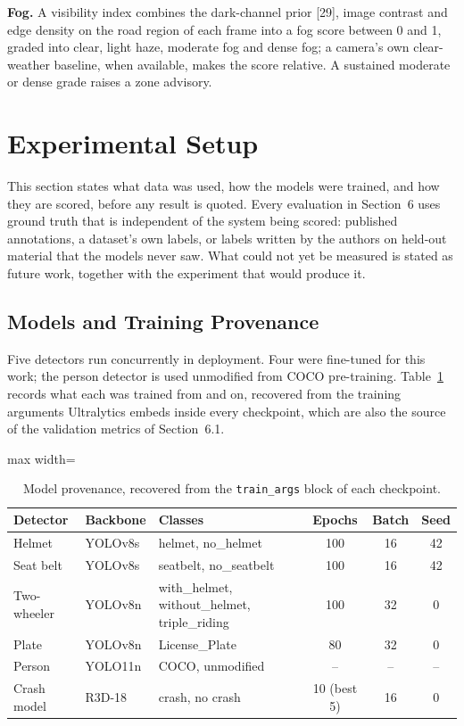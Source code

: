 \documentclass[10pt,a4paper,twocolumn]{article}
\newcommand{\code}[1]{\texttt{#1}}
\begin{document}
\textbf{Fog.} A visibility index combines the dark-channel prior [29], image contrast and edge density on the road
region of each frame into a fog score between 0 and 1, graded into clear, light haze, moderate fog and dense fog; a
camera's own clear-weather baseline, when available, makes the score relative. A sustained moderate or dense grade
raises a zone advisory.

\section{Experimental Setup}
This section states what data was used, how the models were trained, and how they are scored, before any result is
quoted. Every evaluation in Section~6 uses ground truth that is independent of the system being scored: published
annotations, a dataset's own labels, or labels written by the authors on held-out material that the models never saw.
What could not yet be measured is stated as future work, together with the experiment that would produce it.

\subsection{Models and Training Provenance}
Five detectors run concurrently in deployment. Four were fine-tuned for this work; the person detector is used
unmodified from COCO pre-training. Table~\ref{tab:prov} records what each was trained from and on, recovered from the training
arguments Ultralytics embeds inside every checkpoint, which are also the source of the validation metrics of
Section~6.1.

\begin{table}[t]
\centering\scriptsize
\caption{Model provenance, recovered from the \code{train\_args} block of each checkpoint.}\label{tab:prov}
\setlength{\tabcolsep}{2.6pt}
\begin{adjustbox}{max width=\columnwidth}
\begin{tabular}{@{}llp{25mm}ccc@{}}
\toprule
Detector & Backbone & Classes & Epochs & Batch & Seed\\
\midrule
Helmet & YOLOv8s & helmet, no\_helmet & 100 & 16 & 42\\
Seat belt & YOLOv8s & seatbelt, no\_seatbelt & 100 & 16 & 42\\
Two-wheeler & YOLOv8n & with\_helmet, without\_helmet, triple\_riding & 100 & 32 & 0\\
Plate & YOLOv8n & License\_Plate & 80 & 32 & 0\\
Person & YOLO11n & COCO, unmodified & -- & -- & --\\
Crash model & R3D-18 & crash, no crash & 10 (best 5) & 16 & 0\\
\bottomrule
\end{tabular}
\end{adjustbox}
\end{table}
\end{document}

